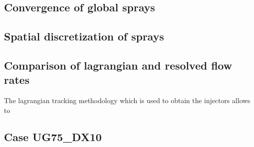 \subsection{Convergence of global sprays}


\subsection{Spatial discretization of sprays}

\subsection{Comparison of lagrangian and resolved flow rates}

The lagrangian tracking methodology which is used to obtain the injectors allows to 

\clearpage

\subsection*{Case UG75\_DX10}





